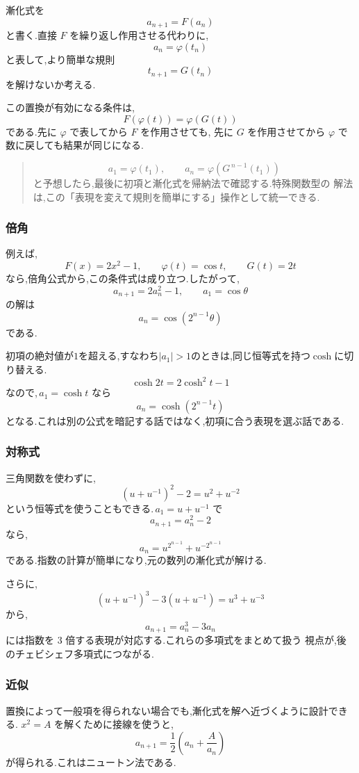漸化式を
\[
  a_{n+1}=F(a_n)
\]
と書く.直接 $F$ を繰り返し作用させる代わりに,
\[
  a_n=\varphi(t_n)
\]
と表して,より簡単な規則
\[
  t_{n+1}=G(t_n)
\]
を解けないか考える.

この置換が有効になる条件は,
\[
  F(\varphi(t))=\varphi(G(t))
\]
である.先に $\varphi$ で表してから $F$ を作用させても,
先に $G$ を作用させてから $\varphi$ で数に戻しても結果が同じになる.

\begin{quote}
\[
  a_1=\varphi(t_1),
  \qquad
  a_n=\varphi\left(G^{\,n-1}(t_1)\right)
\]
と予想したら,最後に初項と漸化式を帰納法で確認する.特殊関数型の
解法は,この「表現を変えて規則を簡単にする」操作として統一できる.
\end{quote}

\subsubsection{倍角}

例えば,
\[
  F(x)=2x^2-1,
  \qquad
  \varphi(t)=\cos t,
  \qquad
  G(t)=2t
\]
なら,倍角公式から,この条件式は成り立つ.したがって,
\[
  a_{n+1}=2a_n^2-1,
  \qquad
  a_1=\cos\theta
\]
の解は
\[
  a_n=\cos(2^{n-1}\theta)
\]
である.

初項の絶対値が$1$を超える,すなわち$|a_1|>1$のときは,同じ恒等式を持つ$\cosh$に切り替える.
\[
  \cosh 2t=2\cosh^2t-1
\]
なので,\,$a_1=\cosh t$ なら
\[
  a_n=\cosh(2^{n-1}t)
\]
となる.これは別の公式を暗記する話ではなく,初項に合う表現を選ぶ話である.

\subsubsection{対称式}

三角関数を使わずに,
\[
  (u+u^{-1})^2-2=u^2+u^{-2}
\]
という恒等式を使うこともできる.\,$a_1=u+u^{-1}$ で
\[
  a_{n+1}=a_n^2-2
\]
なら,
\[
  a_n=u^{2^{n-1}}+u^{-2^{n-1}}
\]
である.指数の計算が簡単になり,元の数列の漸化式が解ける.

さらに,
\[
  (u+u^{-1})^3-3(u+u^{-1})=u^3+u^{-3}
\]
から,
\[
  a_{n+1}=a_n^3-3a_n
\]
には指数を $3$ 倍する表現が対応する.これらの多項式をまとめて扱う
視点が,後のチェビシェフ多項式につながる.

\subsubsection{近似}

置換によって一般項を得られない場合でも,漸化式を解へ近づくように設計できる.
$x^2=A$ を解くために接線を使うと,
\[
  a_{n+1}=\frac12\left(a_n+\frac{A}{a_n}\right)
\]
が得られる.これはニュートン法である.

